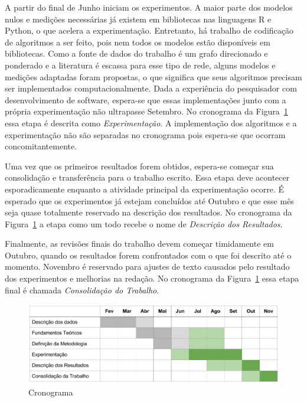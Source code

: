 \documentclass[12pt,a4paper]{article}
\begin{document}
A partir do final de Junho iniciam os experimentos. A maior parte dos modelos nulos e medições necessárias já existem em bibliotecas nas linguagens R e Python, o que acelera a experimentação. Entretanto, há trabalho de codificação de algoritmos a ser feito, pois nem todos os modelos estão disponíveis em bibliotecas. Como a fonte de dados do trabalho é um grafo direcionado e ponderado e a literatura é escassa para esse tipo de rede, alguns modelos e medições adaptadas foram propostas, o que significa que seus algoritmos precisam ser implementados computacionalmente. Dada a experiência do pesquisador com desenvolvimento de software, espera-se que essas implementações junto com a própria experimentação não ultrapasse Setembro. No cronograma da Figura~\ref{fig:cronograma} essa etapa é descrita como \textit{Experimentação}. A implementação dos algoritmos e a experimentação não são separadas no cronograma pois espera-se que ocorram concomitantemente.

Uma vez que os primeiros resultados forem obtidos, espera-se começar sua consolidação e transferência para o trabalho escrito. Essa etapa deve acontecer esporadicamente enquanto a atividade principal da experimentação ocorre. É esperado que os experimentos já estejam concluídos até Outubro e que esse mês seja quase totalmente reservado na descrição dos resultados. No cronograma da Figura~\ref{fig:cronograma} a etapa como um todo recebe o nome de \textit{Descrição dos Resultados}.

Finalmente, as revisões finais do trabalho devem começar timidamente em Outubro, quando os resultados forem confrontados com o que foi descrito até o momento. Novembro é reservado para ajustes de texto causados pelo resultado dos experimentos e melhorias na redação. No cronograma da Figura~\ref{fig:cronograma} essa etapa final é chamada \textit{Consolidação do Trabalho}.

\begin{figure}[htb]
    \centering
    \includegraphics[scale=0.4]{dissertacao-cronograma.png}
    \caption{Cronograma}
    \label{fig:cronograma}
\end{figure}
\end{document}
